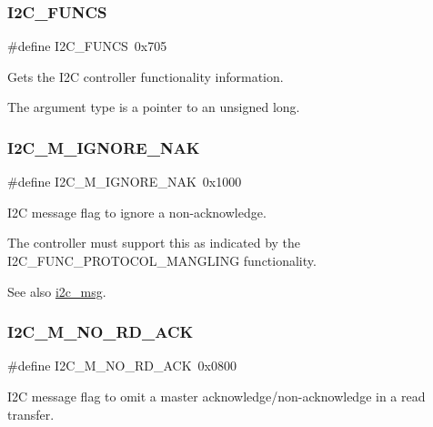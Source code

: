 \subsubsection{\texorpdfstring{I2C\_FUNCS}{I2C\_FUNCS}}
{\footnotesize\ttfamily \#define I2\+C\+\_\+\+F\+U\+N\+CS~0x705}



Gets the I2C controller functionality information. 

The argument type is a pointer to an unsigned long. \mbox{\label{group__I2CLinux_ga0629c50bb05b4c037e726373da50755b}} 
\subsubsection{\texorpdfstring{I2C\_M\_IGNORE\_NAK}{I2C\_M\_IGNORE\_NAK}}
{\footnotesize\ttfamily \#define I2\+C\+\_\+\+M\+\_\+\+I\+G\+N\+O\+R\+E\+\_\+\+N\+AK~0x1000}



I2C message flag to ignore a non-\/acknowledge. 

The controller must support this as indicated by the I2\+C\+\_\+\+F\+U\+N\+C\+\_\+\+P\+R\+O\+T\+O\+C\+O\+L\+\_\+\+M\+A\+N\+G\+L\+I\+NG functionality.

\begin{DoxySeeAlso}{See also}
\mbox{\hyperlink{structi2c__msg}{i2c\+\_\+msg}}. 
\end{DoxySeeAlso}
\mbox{\label{group__I2CLinux_gadb8351c5c02ca2b6909baa9d374ff6d4}} 
\subsubsection{\texorpdfstring{I2C\_M\_NO\_RD\_ACK}{I2C\_M\_NO\_RD\_ACK}}
{\footnotesize\ttfamily \#define I2\+C\+\_\+\+M\+\_\+\+N\+O\+\_\+\+R\+D\+\_\+\+A\+CK~0x0800}



I2C message flag to omit a master acknowledge/non-\/acknowledge in a read transfer. 

